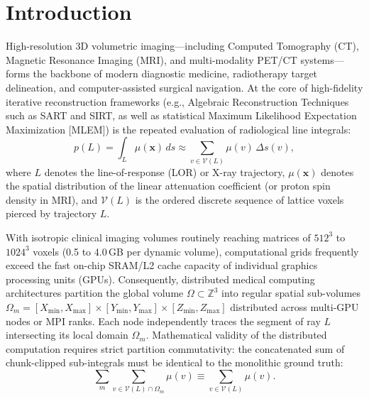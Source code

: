 \documentclass[journal=dme,manuscript=article,11pt]{article}
\begin{document}
\section{Introduction}
\label{sec:intro}

High-resolution 3D volumetric imaging---including Computed Tomography (CT), Magnetic Resonance Imaging (MRI), and multi-modality PET/CT systems---forms the backbone of modern diagnostic medicine, radiotherapy target delineation, and computer-assisted surgical navigation.\cite{feldkamp1984practical,siddon1985fast,jacobs1998fast,long2010separable,kim2024heterogeneous,zhang2023distributed,wang2025distributed,liu2026ultra} At the core of high-fidelity iterative reconstruction frameworks (e.g., Algebraic Reconstruction Techniques such as SART and SIRT, as well as statistical Maximum Likelihood Expectation Maximization [MLEM]) is the repeated evaluation of radiological line integrals:
\begin{equation}
    \label{eq:radon_integral}
    p(L) = \int_L \mu(\mathbf{x}) \, ds \approx \sum_{v \in \mathcal{V}(L)} \mu(v) \, \Delta s(v),
\end{equation}
where $L$ denotes the line-of-response (LOR) or X-ray trajectory, $\mu(\mathbf{x})$ denotes the spatial distribution of the linear attenuation coefficient (or proton spin density in MRI), and $\mathcal{V}(L)$ is the ordered discrete sequence of lattice voxels pierced by trajectory $L$.\cite{siddon1985fast,li2020gpu,chen2023exact,muller2025gecco}

With isotropic clinical imaging volumes routinely reaching matrices of $512^3$ to $1024^3$ voxels (0.5 to 4.0\,GB per dynamic volume), computational grids frequently exceed the fast on-chip SRAM/L2 cache capacity of individual graphics processing units (GPUs). Consequently, distributed medical computing architectures partition the global volume $\Omega \subset \mathbb{Z}^3$ into regular spatial sub-volumes $\Omega_m = [X_{\min}, X_{\max}] \times [Y_{\min}, Y_{\max}] \times [Z_{\min}, Z_{\max}]$ distributed across multi-GPU nodes or MPI ranks.\cite{zhang2023distributed,song2023differentiable,wang2025distributed} Each node independently traces the segment of ray $L$ intersecting its local domain $\Omega_m$. Mathematical validity of the distributed computation requires strict partition commutativity: the concatenated sum of chunk-clipped sub-integrals must be identical to the monolithic ground truth:
\begin{equation}
    \label{eq:commutativity_integral}
    \sum_{m} \sum_{v \in \mathcal{V}(L) \cap \Omega_m} \mu(v) \equiv \sum_{v \in \mathcal{V}(L)} \mu(v).
\end{equation}
\end{document}
